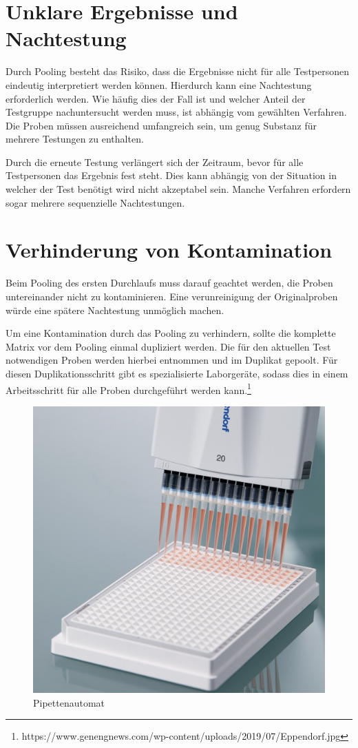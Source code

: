 \section{Unklare Ergebnisse und Nachtestung}%
Durch Pooling besteht das Risiko, dass die Ergebnisse nicht für alle Testpersonen eindeutig interpretiert werden können.
Hierdurch kann eine Nachtestung erforderlich werden.
Wie häufig dies der Fall ist und welcher Anteil der Testgruppe nachuntersucht werden muss, ist abhängig vom gewählten Verfahren.
Die Proben müssen ausreichend umfangreich sein, um genug Substanz für mehrere Testungen zu enthalten.

Durch die erneute Testung verlängert sich der Zeitraum, bevor für alle Testpersonen das Ergebnis fest steht.
Dies kann abhängig von der Situation in welcher der Test benötigt wird nicht akzeptabel sein.
Manche Verfahren erfordern sogar mehrere sequenzielle Nachtestungen.

\section{Verhinderung von Kontamination}%
Beim Pooling des ersten Durchlaufs muss darauf geachtet werden, die Proben untereinander nicht zu kontaminieren.
Eine verunreinigung der Originalproben würde eine spätere Nachtestung unmöglich machen.

Um eine Kontamination durch das Pooling zu verhindern, sollte die komplette Matrix vor dem Pooling einmal dupliziert werden. 
Die für den aktuellen Test notwendigen Proben werden hierbei entnommen und im Duplikat gepoolt.
Für diesen Duplikationsschritt gibt es spezialisierte Laborgeräte, sodass dies in einem Arbeitsschritt für alle Proben durchgeführt werden kann.\footnote{https://www.genengnews.com/wp-content/uploads/2019/07/Eppendorf.jpg}

\begin{figure}[h]
	\centering
	\includegraphics[width=.45\textwidth]{img/Pipettenmatrix}
	\caption{Pipettenautomat\footnotemark}
\end{figure}


